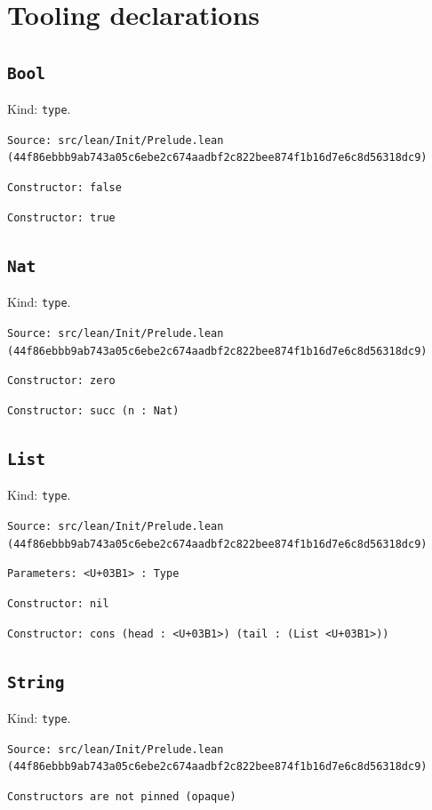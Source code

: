 \documentclass[11pt]{article}
\begin{document}
\section*{Tooling declarations}
\subsection*{\texttt{Bool}}
\noindent Kind: \texttt{type}.\par
\noindent \texttt{Source: src/lean/Init/Prelude.lean (44f86ebbb9ab743a05c6ebe2c674aadbf2c822bee874f1b16d7e6c8d56318dc9)}\par
\noindent \texttt{Constructor: false }\par
\noindent \texttt{Constructor: true }\par
\subsection*{\texttt{Nat}}
\noindent Kind: \texttt{type}.\par
\noindent \texttt{Source: src/lean/Init/Prelude.lean (44f86ebbb9ab743a05c6ebe2c674aadbf2c822bee874f1b16d7e6c8d56318dc9)}\par
\noindent \texttt{Constructor: zero }\par
\noindent \texttt{Constructor: succ (n : Nat)}\par
\subsection*{\texttt{List}}
\noindent Kind: \texttt{type}.\par
\noindent \texttt{Source: src/lean/Init/Prelude.lean (44f86ebbb9ab743a05c6ebe2c674aadbf2c822bee874f1b16d7e6c8d56318dc9)}\par
\noindent \texttt{Parameters: <U+03B1> : Type}\par
\noindent \texttt{Constructor: nil }\par
\noindent \texttt{Constructor: cons (head : <U+03B1>) (tail : (List <U+03B1>))}\par
\subsection*{\texttt{String}}
\noindent Kind: \texttt{type}.\par
\noindent \texttt{Source: src/lean/Init/Prelude.lean (44f86ebbb9ab743a05c6ebe2c674aadbf2c822bee874f1b16d7e6c8d56318dc9)}\par
\noindent \texttt{Constructors are not pinned (opaque)}\par
\end{document}
